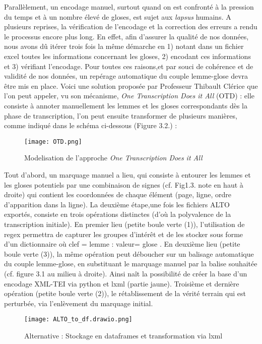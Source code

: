 \documentclass[a4paper, twoside, 12pt]{book}
\begin{document}
Parallèlement, un encodage manuel, surtout quand on est confronté à la pression du temps et à un nombre élevé de gloses, est sujet aux \textit{lapsus} humains. A plusieurs reprises, la vérification de l'encodage et la correction des erreurs a rendu le processus encore plus long. En effet, afin d'assurer la qualité de nos données, nous avons dû itérer trois fois la même démarche en 1) notant dans un fichier excel toutes les informations concernant les gloses, 2) encodant ces informations et 3) vérifiant l'encodage. Pour toutes ces raisons,et par souci de cohérence et de validité de nos données, un repérage automatique du couple lemme-glose devra être mis en place. Voici une solution proposée par Professeur Thibault Clérice que l'on peut appeler, vu son mécanisme, \textit{One Transcription Does it All} (OTD) : elle consiste à annoter manuellement les lemmes et les gloses correspondants dès la phase de transcription, l'on peut ensuite transformer de plusieurs manières, comme indiqué dans le schéma ci-dessous (Figure 3.2.) : 

\begin{figure}[H]
    \centering
    \texttt{[image: OTD.png]}
    \caption{Modelisation de l'approche \textit{One Transcription Does it All}}
\end{figure}

Tout d'abord, un marquage manuel a lieu, qui consiste à entourer les lemmes et les gloses potentiels par une combinaison de signes (cf. Fig1.3. note en haut à droite) qui contient les coordonnées de chaque élément (page, ligne, ordre d'apparition dans la ligne). La deuxième étape,une fois les fichiers ALTO exportés, consiste en trois opérations distinctes (d'où la polyvalence de la transcription initiale). En premier lieu (petite boule verte (1)), l'utilisation de regex permettra de capturer les groupes d'intérêt et de les stocker sous forme d'un dictionnaire où {clef = \og{}lemme \fg{} : valeur= \og{}glose \fg{}}. En deuxième lieu (petite boule verte (3)), la même opération peut déboucher sur un balisage automatique du couple lemme-glose, en substituant le marquage manuel par la balise souhaitée (cf. figure 3.1 au milieu à droite). Ainsi naît la possibilité de créer la base d'un encodage XML-TEI via python et lxml (partie jaune). Troisième et dernière opération (petite boule verte (2)), le rétablissement de la vérité terrain qui est perturbée, via l'enlèvement du marquage initial. 

\begin{figure}[H]
    \centering
    \texttt{[image: ALTO\_to\_df.drawio.png]}
    \caption{Alternative : Stockage en dataframes et transformation via lxml }
\end{figure}
\end{document}
